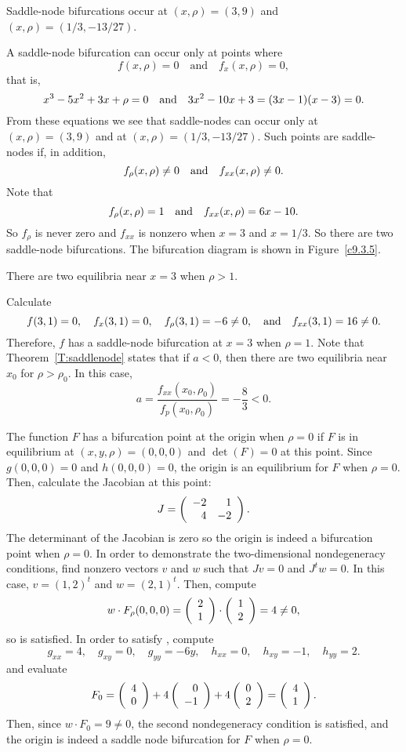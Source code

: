 \documentclass{ximera}
\begin{document}
\begin{figure}[htb]
                       \centerline{%
                       }
\end{figure}

\ans Saddle-node bifurcations occur at $(x,\rho)=(3,9)$ and 
$(x,\rho)=(1/3,-13/27)$.

\soln A saddle-node bifurcation can occur only at points where
\[ 
f(x,\rho)=0 \quad \mbox{and}\quad f_x(x,\rho)=0,
\]
that is, 
\[
x^3 -5x^2 + 3x + \rho = 0 \quad\mbox{and}\quad 3x^2 -10x +3 = (3x-1)(x-3)=0.
\]
From these equations we see that saddle-nodes can occur only at 
$(x,\rho)=(3,9)$ and at $(x,\rho)=(1/3,-13/27)$. Such points are saddle-nodes 
if, in addition, 
\[
f_\rho(x,\rho)\neq 0 \quad\mbox{and}\quad  f_{xx}(x,\rho)\neq 0.
\]
Note that
\[
f_\rho(x,\rho) = 1  \quad\mbox{and}\quad  f_{xx}(x,\rho) = 6x - 10.
\]
So $f_\rho$ is never zero and $f_{xx}$ is nonzero when $x=3$ and $x=1/3$.
So there are two saddle-node bifurcations.  The 
bifurcation diagram is shown in Figure~\ref{c9.3.5}.
\begin{figure}[htb]
     \centerline{%
     }
\end{figure}




\ans There are two equilibria near $x = 3$ when $\rho > 1$.

\soln Calculate
\[
f(3,1) = 0, \quad
f_x(3,1) = 0, \quad
f_\rho(3,1) = -6 \neq 0, \quad\mbox{and}\quad
f_{xx}(3,1) = 16 \neq 0.
\]
Therefore, $f$ has a saddle-node bifurcation at $x = 3$ when $\rho =
1$.  Note that Theorem~\ref{T:saddlenode} states
that if $a < 0$, then there are two equilibria near $x_0$ for $\rho >
\rho_0$.  In this case,
\[
a = \frac{f_{xx}(x_0,\rho_0)}{f_p(x_0,\rho_0)} = -\frac{8}{3} < 0.
\]

The function $F$ has a bifurcation point at the origin when $\rho = 0$
if $F$ is in equilibrium at $(x,y,\rho) = (0,0,0)$ and $\det(F) = 0$ at
this point.  Since $g(0,0,0) = 0$ and $h(0,0,0) = 0$, the origin is an
equilibrium for $F$ when $\rho = 0$.  Then, calculate the Jacobian at
this point:
\[
J = \left(\begin{array}{rr} -2 & 1\\ 4 &-2\end{array}\right).
\]
The determinant of the Jacobian is zero so the origin is indeed a
bifurcation point when $\rho = 0$.  In order to demonstrate the
two-dimensional nondegeneracy conditions, find nonzero vectors $v$ and
$w$ such that $Jv = 0$ and $J^tw = 0$.  In this case, $v = (1,2)^t$ and
$w = (2,1)^t$.  Then, compute
\[
w \cdot F_\rho(0,0,0) = \left(\begin{array}{r} 2 \\ 1\end{array}\right) \cdot \left(\begin{array}{r} 1 \\ 2\end{array}\right) =
4 \neq 0,
\]
so  is satisfied.  In order to satisfy ,
compute
\[
g_{xx} = 4, \quad
g_{xy} = 0, \quad
g_{yy} = -6y, \quad
h_{xx} = 0, \quad
h_{xy} = -1, \quad
h_{yy} = 2.
\]
and evaluate
\[
F_0 = \left(\begin{array}{r} 4 \\ 0\end{array}\right) + 4\left(\begin{array}{r} 0 \\ -1\end{array}\right) + 4\left(\begin{array}{r} 0 \\ 2\end{array}\right) =
\left(\begin{array}{r} 4 \\ 1\end{array}\right).
\]
Then, since $w \cdot F_0 = 9 \neq 0$, the second nondegeneracy condition
is satisfied, and the origin is indeed a saddle node bifurcation for $F$
when $\rho = 0$.
\end{document}
